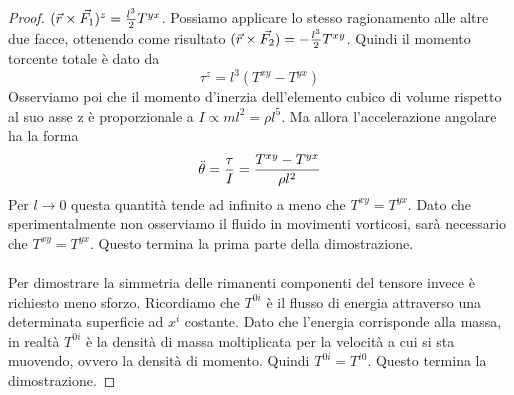 \documentclass[]{report}
\theoremstyle{definition}
\theoremstyle{Theorem}
\theoremstyle{definition}
\theoremstyle{definition}
\theoremstyle{definition}
\begin{document}
\begin{proof}
	$(\vec{r}\times\vec{F_1})^z={l^3\over 2}T^{yx}$. Possiamo applicare lo stesso ragionamento alle altre due facce, ottenendo come risultato $(\vec{r}\times\vec{F_2})=-{l^3\over 2}T^{xy}$. Quindi il momento torcente totale è dato da $$\tau^z=l^3(T^{xy}-T^{yx})$$
	Osserviamo poi che il momento d'inerzia dell'elemento cubico di volume rispetto al suo asse z è proporzionale a $I\propto ml^2=\rho l^5$. Ma allora l'accelerazione angolare ha la forma $$\ddot{\theta}={\tau\over I}={T^{xy}-T^{yx}\over \rho l^2}$$
	Per $l\rightarrow 0$ questa quantità tende ad infinito a meno che $T^{xy}=T^{yx}$. Dato che sperimentalmente non osserviamo il fluido in movimenti vorticosi, sarà necessario che $T^{xy}=T^{yx}$. Questo termina la prima parte della dimostrazione.\\
	\\
	Per dimostrare la simmetria delle rimanenti componenti del tensore invece è richiesto meno sforzo. Ricordiamo che $T^{0i}$ è il flusso di energia attraverso una determinata superficie ad $x^i$ costante. Dato che l'energia corrisponde alla massa, in realtà $T^{0i}$ è la densità di massa moltiplicata per la velocità a cui si sta muovendo, ovvero la densità di momento. Quindi $T^{0i}=T^{i0}$.
	Questo termina la dimostrazione.
\end{proof}
\end{document}
